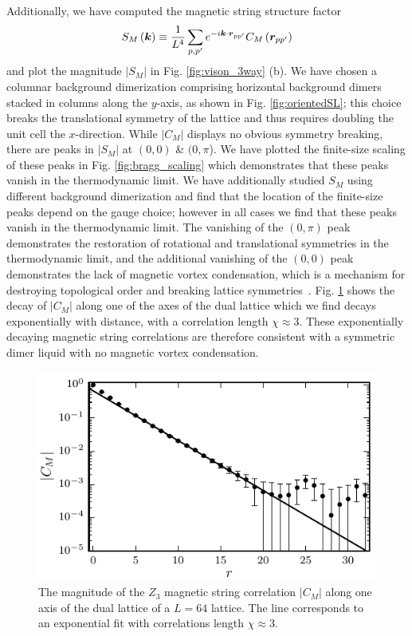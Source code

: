 \documentclass[twocolumn,prb,aps,floatfix,superscriptaddress]{revtex4-1}
\newcommand{\figref}[1]{Fig. \ref{#1}}
\begin{document}
Additionally, we have computed the magnetic string structure factor
\begin{equation}
S_M\left( \bm{k} \right) \equiv \frac{1}{ L^4} \sum_{p,p'} e^{-i \bm{k} \cdot \bm{r}_{pp'}} C_M\left( \bm{r}_{pp'}\right)  \notag
\end{equation}
and plot the magnitude $|S_M|$ in \figref{fig:vison_3way} (b). We have chosen a columnar background dimerization comprising horizontal background dimers stacked in columns along the $y$-axis, as shown in \figref{fig:orientedSL}; this choice breaks the translational symmetry of the lattice and thus requires doubling the unit cell the $x$-direction. While $|C_M|$ displays no obvious symmetry breaking, there are peaks in $|S_M|$ at $(0,0)$ \& $(0,\pi$). We have plotted the finite-size scaling of these peaks in \figref{fig:bragg_scaling} which demonstrates that these peaks vanish in the thermodynamic limit. We have additionally studied $S_M$ using different background dimerization and find that the location of the finite-size peaks depend on the gauge choice; however in all cases we find that these peaks vanish in the thermodynamic limit. The vanishing of the $(0,\pi)$ peak demonstrates the restoration of rotational and translational symmetries in the thermodynamic limit, and the additional vanishing of the $(0,0)$ peak demonstrates the lack of magnetic vortex condensation, which is a mechanism for destroying topological order and breaking lattice symmetries~\cite{Jalabert1991,Ralko2007,Huh2011}. \figref{fig:vison_cor} shows the decay of $|C_M|$ along one of the axes of the dual lattice which we find decays exponentially with distance, with a correlation length $\chi\approx 3$. These exponentially decaying magnetic string correlations are therefore consistent with a symmetric dimer liquid with no magnetic vortex condensation.
\begin{figure}[]
    \centering
    \includegraphics[width=1.0\columnwidth]{spatial_cors_z3_vis.pdf}
    \caption{ The magnitude of the $Z_3$ magnetic string correlation $|C_M|$ along one axis of the dual lattice of a $L=64$ lattice. The line corresponds to an exponential fit with correlations length $\chi\approx 3$.}
    \label{fig:vison_cor}
\end{figure}
\end{document}
